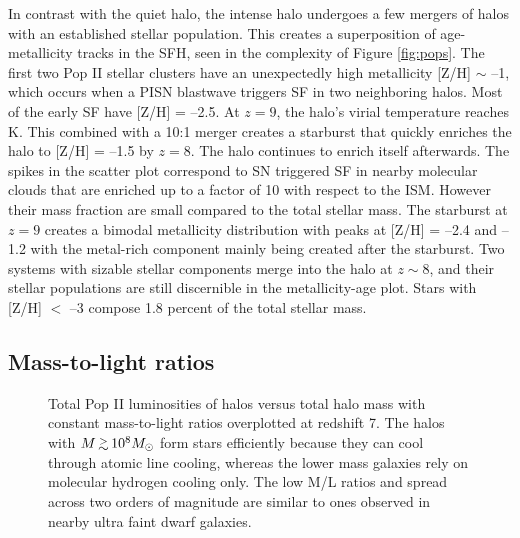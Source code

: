 \documentclass[apjl]{emulateapj}
\begin{document}
In contrast with the quiet halo, the intense halo undergoes a few
mergers of halos with an established stellar population.  This creates
a superposition of age-metallicity tracks in the SFH, seen in the
complexity of Figure \ref{fig:pops}.  The first two Pop II stellar
clusters have an unexpectedly high metallicity [Z/H] $\sim$ --1, which
occurs when a PISN blastwave triggers SF in two neighboring halos.
Most of the early SF have [Z/H] = --2.5.  At $z=9$, the halo's virial
temperature reaches  K.  This combined with a 10:1 merger
creates a starburst that quickly enriches the halo to [Z/H] = --1.5 by
$z=8$.  The halo continues to enrich itself afterwards.  The spikes in
the scatter plot correspond to SN triggered SF in nearby molecular
clouds that are enriched up to a factor of 10 with respect to the ISM.
However their mass fraction are small compared to the total stellar
mass.  The starburst at $z=9$ creates a bimodal metallicity
distribution with peaks at [Z/H] = --2.4 and --1.2 with the metal-rich
component mainly being created after the starburst.  Two systems with
sizable stellar components merge into the halo at $z \sim 8$, and
their stellar populations are still discernible in the metallicity-age
plot.  Stars with [Z/H] $<$ --3 compose 1.8 percent of the total
stellar mass.

\subsection{Mass-to-light ratios}


\begin{figure}
\caption{\label{fig:massfn} Total Pop II luminosities of halos versus
  total halo mass with constant mass-to-light ratios overplotted at
  redshift 7.  The halos with $M \gsim 10^8 \Ms$ form stars
  efficiently because they can cool through atomic line cooling,
  whereas the lower mass galaxies rely on molecular hydrogen cooling
  only.  The low M/L ratios and spread across two orders of magnitude
  are similar to ones observed in nearby ultra faint dwarf galaxies.}
\end{figure}

\end{document}
